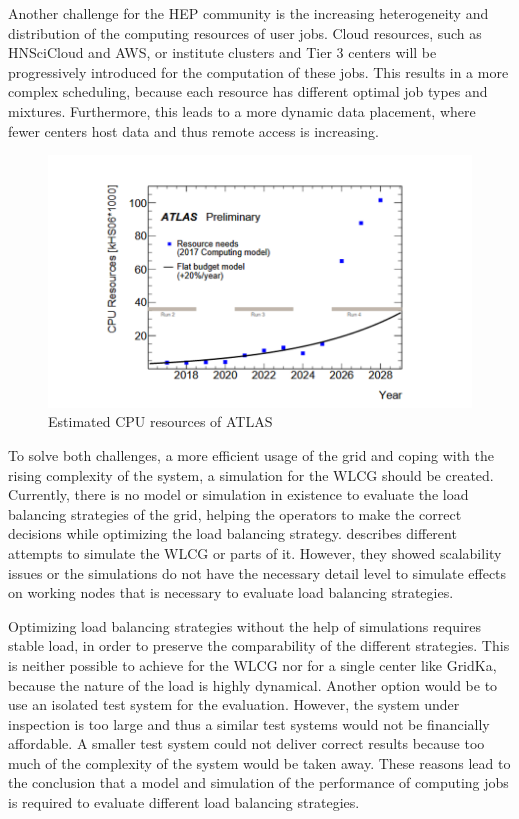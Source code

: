 \documentclass[a4paper]{jpconf}
\begin{document}
Another challenge for the HEP community is the increasing heterogeneity and distribution of the computing resources of user jobs. Cloud resources, such as HNSciCloud and AWS, or institute clusters and Tier 3 centers will be progressively introduced for the computation of these jobs. This results in a more complex scheduling, because each resource has different optimal job types and mixtures. Furthermore, this leads to a more dynamic data placement, where fewer centers host data and thus remote access is increasing.

\begin{figure}
	\centering
	\includegraphics[width=0.7\linewidth]{images/resources}
	\caption[]{Estimated CPU resources of ATLAS \cite{community}}
	\label{resources}
\end{figure}

To solve both challenges, a more efficient usage of the grid and coping with the rising complexity of the system, a simulation for the WLCG should be created.
Currently, there is no model or simulation in existence to evaluate the load balancing strategies of the grid, helping the operators to make the correct decisions while optimizing the load balancing strategy.
 describes different attempts to simulate the WLCG or parts of it. However, they showed scalability issues or the simulations do not have the necessary detail level to simulate effects on working nodes that is necessary to evaluate load balancing strategies.

Optimizing load balancing strategies without the help of simulations requires stable load, in order to preserve the comparability of the different strategies. This is neither possible to achieve for the WLCG nor for a single center like GridKa, because the nature of the load is highly dynamical. Another option would be to use an isolated test system for the evaluation. However, the system under inspection is too large and thus a similar test systems would not be financially affordable. A smaller test system could not deliver correct results because too much of the complexity of the system would be taken away.
These reasons lead to the conclusion that a model and simulation of the performance of computing jobs is required to evaluate different load balancing strategies.
\end{document}
